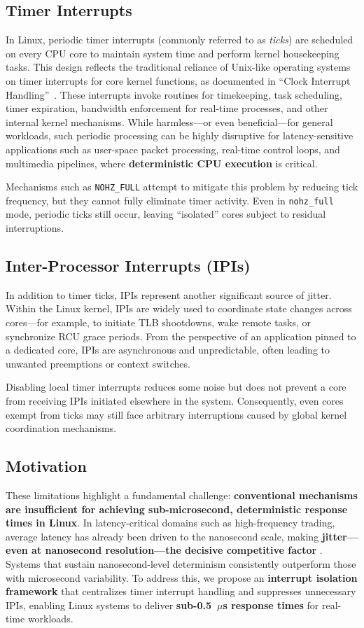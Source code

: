 \documentclass[letterpaper]{article}
\begin{document}
\subsection{Timer Interrupts}
In Linux, periodic timer interrupts (commonly referred to as \emph{ticks})
are scheduled on every CPU core to maintain system time and perform
kernel housekeeping tasks\cite{Corbet}. This design reflects the traditional reliance
of Unix-like operating systems on timer interrupts for core kernel
functions, as documented in 
``Clock Interrupt Handling''~\cite[Section~5.2]{Vahalia96}.
These interrupts invoke routines for timekeeping, task scheduling,
timer expiration, bandwidth enforcement for real-time processes,
and other internal kernel mechanisms. While harmless---or even
beneficial---for general workloads, such periodic processing can
be highly disruptive for latency-sensitive applications such as
user-space packet processing, real-time control loops, and multimedia
pipelines, where \textbf{deterministic CPU execution} is critical.

Mechanisms such as \texttt{NOHZ\_FULL} attempt to mitigate this problem
by reducing tick frequency, but they cannot fully eliminate timer activity.
Even in \texttt{nohz\_full} mode, periodic ticks still occur, leaving
``isolated'' cores subject to residual interruptions.


\subsection{Inter-Processor Interrupts (IPIs)}
In addition to timer ticks, IPIs represent another significant source of 
jitter. Within the Linux kernel, IPIs are widely used to coordinate state 
changes across cores---for example, to initiate TLB shootdowns, 
wake remote tasks, or synchronize RCU grace periods. 
From the perspective of an application pinned to a dedicated core, 
IPIs are asynchronous and unpredictable, often leading to unwanted 
preemptions or context switches.  

Disabling local timer interrupts reduces some noise but does not prevent 
a core from receiving IPIs initiated elsewhere in the system. 
Consequently, even cores exempt from ticks may still face arbitrary 
interruptions caused by global kernel coordination mechanisms.  

\subsection{Motivation}
These limitations highlight a fundamental challenge:
\textbf{conventional mechanisms are insufficient for achieving sub-microsecond, deterministic response times in Linux}.
In latency-critical domains such as high-frequency trading, average latency has already been driven to the nanosecond scale, making \textbf{jitter—even at nanosecond resolution—the decisive competitive factor}  \cite{risk2024ultra}.  Systems that sustain nanosecond-level determinism consistently outperform those with microsecond variability.
To address this, we propose an \textbf{interrupt isolation framework} that centralizes timer interrupt handling and suppresses unnecessary IPIs, enabling Linux systems to deliver \textbf{sub-0.5~$\mu$s response times} for real-time workloads.
\end{document}
